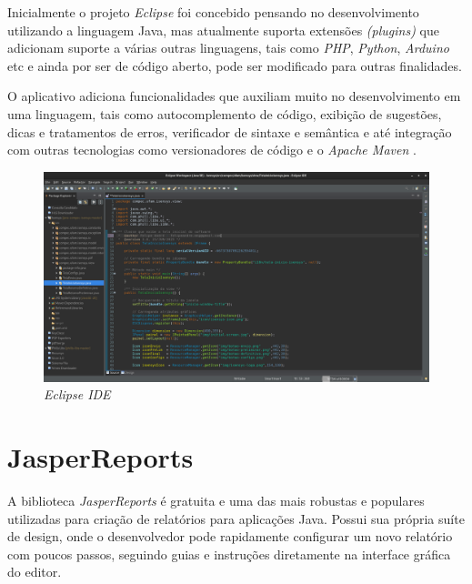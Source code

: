 \documentclass[
	12pt,			%
	openright,		%
	oneside,	
	a4paper,		%
	english,		%
	brazil			%
]{abntex2/abntex2}  %
\begin{document}
			Inicialmente o projeto \textit{Eclipse} \cite{eclipse} foi concebido pensando no desenvolvimento utilizando a linguagem Java, mas atualmente suporta extensões \textit{(plugins)} que adicionam suporte a várias outras linguagens, tais como \textit{PHP}, \textit{Python}, \textit{Arduino} etc e ainda por ser de código aberto, pode ser modificado para outras finalidades.
			
			O aplicativo adiciona funcionalidades que auxiliam muito no desenvolvimento em uma linguagem, tais como autocomplemento de código, exibição de sugestões, dicas e tratamentos de erros, verificador de sintaxe e semântica e até integração com outras tecnologias como versionadores de código e o \textit{Apache Maven} \cite{maven}.
			
			\begin{figure}[ht]
				\begin{center}
					
					\caption{\textit{Eclipse IDE}}
					\label{eclipse-img}
					
					\includegraphics[scale=0.25]{img/eclipse-ide}
					
				\end{center}
			\end{figure}
		
		\section{JasperReports\textregistered} \label{jasper-reports}
		
			A biblioteca \textit{JasperReports\textregistered} \cite{jasper} é gratuita e uma das mais robustas e populares utilizadas para criação de relatórios para aplicações Java. Possui sua própria suíte de design, onde o desenvolvedor pode rapidamente configurar um novo relatório com poucos passos, seguindo guias e instruções diretamente na interface gráfica do editor.
			
\end{document}
